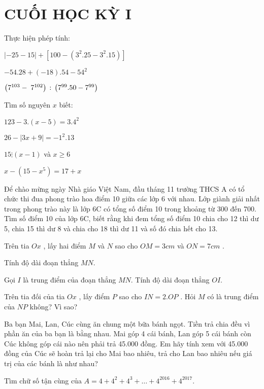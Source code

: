 \section{CUỐI HỌC KỲ I}
\setcounter{ex}{0}
\begin{ex}
	Thực hiện phép tính:
	\begin{listEX}
	\item $\left| { - 25 - 15} \right| + \left[ {100 - \left( {{3^2}.25 - {3^2}.15} \right)} \right]$
\item $ - 54.28 + \left( { - 18} \right).54 - {54^2}$
\item $\left( {{\rm{ }}{7^{103}} - \;{7^{102}}} \right){\rm{ }}:{\rm{ }}\left( {{\rm{ }}{7^{99}}.50{\rm{ }} - {\rm{ }}{7^{99}}} \right)$
	\end{listEX}
\end{ex}
\begin{ex}
	Tìm số nguyên $x$ biết:
	\begin{listEX}[2]
	\item $123 - 3.\left( {x - 5} \right) = {3.4^2}$
\item $26 - \left| {3x + 9} \right| =  - {1^2}.13$
\item $15 \vdots \left( {x - 1} \right)$ và $x \ge 6$
\item $x - \left( {15 - {x^5}} \right) = 17 + x$
	\end{listEX}
\end{ex}
\begin{ex}
	Để chào mừng ngày Nhà giáo Việt Nam, đầu tháng 11 trường THCS A có tổ chức thi đua phong trào hoa điểm 10 giữa các lớp 6 với nhau. Lớp giành giải nhất trong phong trào này là lớp 6C có tổng số điểm 10 trong khoảng từ 300 đến 700. Tìm số điểm 10 của lớp 6C, biết rằng khi đem tổng số điểm 10 chia cho 12 thì dư 5, chia 15 thì dư 8 và chia cho 18 thì dư 11 và số đó chia hết cho 13.
\end{ex}
\begin{ex}
	Trên tia  $Ox$ , lấy hai điểm $M$ và $N$ sao cho  $OM = 3cm$  và  $ON = 7cm$ . 
		\begin{listEX}
			\item Tính độ dài đoạn thẳng $MN$.
\item Gọi $I$ là trung điểm của đoạn thẳng $MN$. Tính độ dài đoạn thẳng $OI$.
\item Trên tia đối của tia  $Ox$ , lấy điểm $P$ sao cho  $IN = 2.OP$ . Hỏi $M$ có là trung điểm của $NP$ không? Vì sao?
		\end{listEX}
\end{ex}
\begin{ex}
	Ba bạn Mai, Lan, Cúc cùng ăn chung một bữa bánh ngọt. Tiền trả chia đều vì phần ăn của ba bạn là bằng nhau. Mai góp 4 cái bánh, Lan góp 5 cái bánh còn Cúc không góp cái nào nên phải trả 45.000 đồng. Em hãy tính xem với 45.000 đồng của Cúc sẽ hoàn trả lại cho Mai bao nhiêu, trả cho Lan bao nhiêu nếu giá trị của các bánh là như nhau?
\end{ex}
\begin{ex}
	Tìm chữ số tận cùng của  $A = 4 + {4^2} + {4^3} +  \ldots  + {4^{2016}} + {4^{2017}}$.
\end{ex}